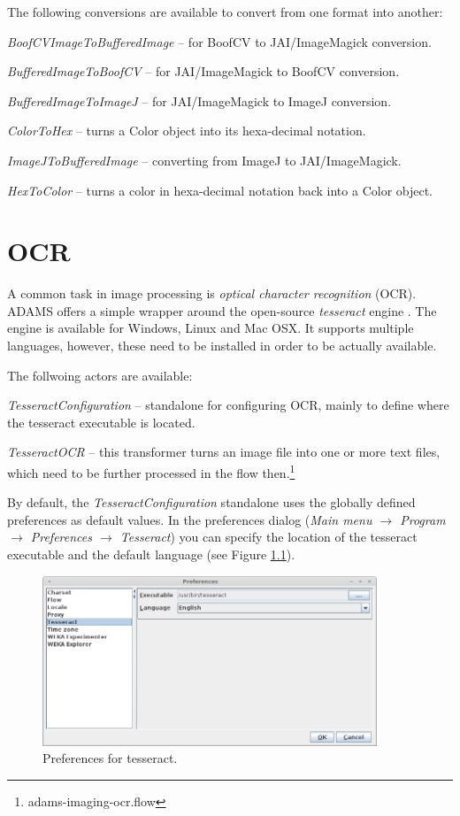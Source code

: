 \documentclass[a4paper]{book}
\begin{document}
The following conversions are available to convert from one
format into another:
\begin{tight_itemize}
	\item \textit{BoofCVImageToBufferedImage} -- for BoofCV to JAI/ImageMagick
	conversion.
	\item \textit{BufferedImageToBoofCV} -- for JAI/ImageMagick to BoofCV
	conversion.
	\item \textit{BufferedImageToImageJ} -- for JAI/ImageMagick to ImageJ
	conversion.
	\item \textit{ColorToHex} -- turns a Color object into its hexa-decimal 
	notation.
	\item \textit{ImageJToBufferedImage} -- converting from ImageJ to
	JAI/ImageMagick.
	\item \textit{HexToColor} -- turns a color in hexa-decimal notation back 
	into a Color object.
\end{tight_itemize}


\chapter{OCR}
A common task in image processing is \textit{optical character recognition} 
(OCR). ADAMS offers a simple wrapper around the open-source \textit{tesseract} 
engine \cite{tesseract}. The engine is available for Windows, Linux and Mac OSX.
It supports multiple languages, however, these need to be installed in order to
be actually available.

The follwoing actors are available:
\begin{tight_itemize}
	\item \textit{TesseractConfiguration} -- standalone for configuring OCR, 
	mainly to define where the tesseract executable is located.
	\item \textit{TesseractOCR} -- this transformer turns an image file into
	one or more text files, which need to be further processed in the flow
	then.\footnote{adams-imaging-ocr.flow}
\end{tight_itemize}

By default, the \textit{TesseractConfiguration} standalone uses the globally
defined preferences as default values. In the preferences dialog 
(\textit{Main menu $\rightarrow$ Program $\rightarrow$ Preferences 
$\rightarrow$ Tesseract}) you can specify the location of the tesseract
executable and the default language (see Figure \ref{tesseract-preferences}).
\begin{figure}[htb]
  \centering
  \includegraphics[width=10.0cm]{images/tesseract-preferences.png}
  \caption{Preferences for tesseract.}
  \label{tesseract-preferences}
\end{figure}
\end{document}
